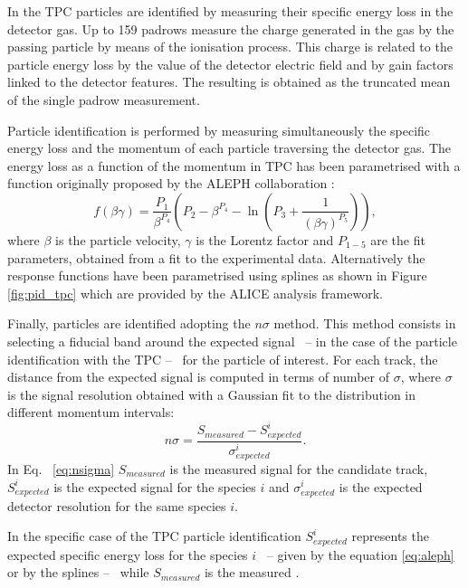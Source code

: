 In the TPC particles are identified by measuring their specific energy loss in the detector gas.
Up to 159 padrows measure the charge generated in the gas by the passing particle by means of the ionisation
process. This charge is related to the particle energy loss by the value of the detector electric
field and by gain factors linked to the detector features. 
The resulting \dedx is obtained as the truncated mean of the single padrow measurement.

Particle identification is performed by measuring simultaneously the specific energy loss \dedx 
and the momentum of each particle traversing the detector gas.
The energy loss as a function of the momentum in TPC has been parametrised with a function originally
proposed by the ALEPH collaboration \cite{aleph}:
\begin{equation} \label{eq:aleph}
    f(\beta \gamma) = \frac{P_{1}}{\beta^{P_{4}}} \left( P_{2} - \beta^{P_{4}}
    - \ln \left( P_{3} + \frac{1}{(\beta \gamma)^{P_{5}}} \right) \right),
\end{equation} 
where $\beta$ is the particle velocity, $\gamma$ is the Lorentz factor and $P_{1-5}$ are the fit
parameters, obtained from a fit to the experimental data.
Alternatively the response functions have been parametrised using splines as shown in Figure
\ref{fig:pid_tpc} which are provided by the ALICE analysis framework.

Finally, particles are identified adopting the $n\sigma$ method.
This method consists in selecting a fiducial band around the expected signal \ -- \dede in the case of
the  particle identification with the TPC -- \ for the particle of interest.
For each track, the distance from the expected signal is computed in terms of 
number of $\sigma$, where $\sigma$ is the signal resolution obtained with a Gaussian fit to the 
\dedx distribution in different momentum intervals:
\begin{equation} \label{eq:nsigma}
    n\sigma = \frac{S_{measured} - S^{i}_{expected}}{\sigma^{i}_{expected}}.
\end{equation}
In Eq. ~\ref{eq:nsigma} $S_{measured}$ is the measured signal for the candidate track,
$S^{i}_{expected}$ is the expected signal for the species $i$ and $\sigma^{i}_{expected}$ is the
expected detector resolution for the same species $i$.

In the specific case of the TPC particle identification $S^{i}_{expected}$ represents the
expected specific energy loss for the species $i$ \ -- given by the equation \ref{eq:aleph}
or by the splines -- \ while $S_{measured}$ is the measured \dedx.

